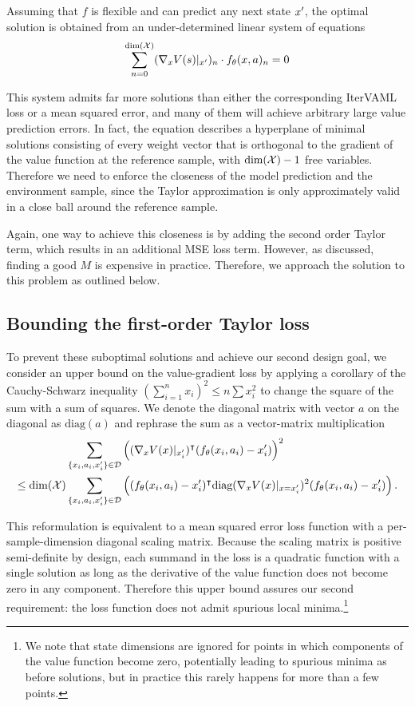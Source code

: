 Assuming that $f$ is flexible and can predict any next state $x'$, the optimal solution is obtained from an under-determined linear system of equations
\begin{align}
    \sum_{n=0}^{\text{dim}(\mathcal{X})} (\nabla_x V(s)|_{x'})_n \cdot f_\theta(x,a)_n = 0
\end{align}

This system admits far more solutions than either the corresponding IterVAML loss or a mean squared error, and many of them will achieve arbitrary large value prediction errors.
In fact, the equation describes a hyperplane of minimal solutions consisting of every weight vector that is orthogonal to the gradient of the value function at the reference sample, with $\text{dim}(\mathcal{X}) - 1$ free variables.
Therefore we need to enforce the closeness of the model prediction and the environment sample, since the Taylor approximation is only approximately valid in a close ball around the reference sample.

Again, one way to achieve this closeness is by adding the second order Taylor term, which results in an additional MSE loss term.
However, as discussed, finding a good $M$ is expensive in practice.
Therefore, we approach the solution to this problem as outlined below.

\subsection{Bounding the first-order Taylor loss}

To prevent these suboptimal solutions and achieve our second design goal, we consider an upper bound on the value-gradient loss by applying a corollary of the Cauchy-Schwarz inequality $\left(\sum_{i=1}^n x_i \right) ^2 \leq n \sum x_i^2$ to change the square of the sum with a sum of squares.
We denote the diagonal matrix with vector $a$ on the diagonal as $\text{diag}(a)$  and rephrase the sum as a vector-matrix multiplication
\begin{align}
    &\sum_{\{x_i,a_i,x'_i\}\in\mathcal{D}} {\left((\nabla_x V(x)|_{x'_i})^\intercal(f_\theta(x_i,a_i) - x'_i) \right)^2}\\
    \leq {\text{dim}(\mathcal{X})} &\sum_{\{x_i,a_i,x'_i\}\in\mathcal{D}}\left((f_\theta(x_i,a_i) - x'_i)^\intercal\text{diag}(\nabla_x V(x)|_{x=x'_i})^2(f_\theta(x_i,a_i) - x'_i) \right) \label{eq:vagram:upper_bound}.
\end{align}

This reformulation is equivalent to a mean squared error loss function with a per-sample-dimension diagonal scaling matrix.
Because the scaling matrix is positive semi-definite by design, each summand in the loss is a quadratic function with a single solution as long as the derivative of the value function does not become zero in any component.
Therefore this upper bound assures our second requirement: the loss function does not admit spurious local minima.\footnote{We note that state dimensions are ignored for points in which components of the value function become zero, potentially leading to spurious minima as before solutions, but in practice this rarely happens for more than a few points.}

